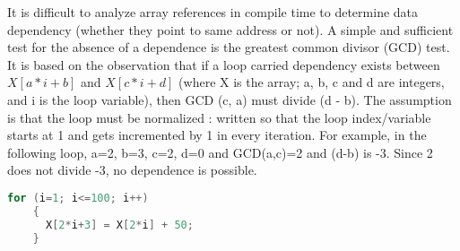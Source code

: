 It is difficult to analyze array references in compile time to 
determine data dependency (whether they point to same address or not). 
A simple and sufficient test for the absence of a dependence is 
the greatest common divisor (GCD) test. It is based on the observation 
that if a loop carried dependency exists between $X[a*i + b]$ and $X[c*i + d]$ 
(where X is the array; a, b, c and d are integers, and i is the loop variable),
 then GCD (c, a) must divide (d - b). The assumption is that the loop must
  be normalized : written so that the loop index/variable starts at 1 and 
  gets incremented by 1 in every iteration. For example, in the following
   loop, a=2, b=3, c=2, d=0 and GCD(a,c)=2 and (d-b) is -3. Since 2 
   does not divide -3, no dependence is possible.

\begin{lstlisting}[language=C,frame=single ,label = lst:expression1]
	for (i=1; i<=100; i++)
	{
	  X[2*i+3] = X[2*i] + 50;
	}
\end{lstlisting}